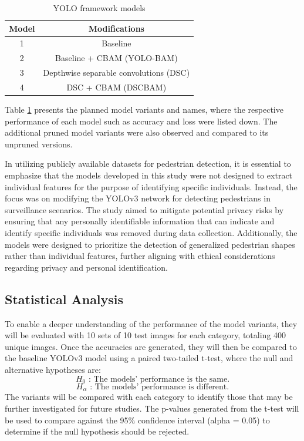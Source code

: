 \begin{table}[!htbp]
    \centering
    \caption{YOLO framework models}
    {
    \begin{tabular}{cc}
        Model & Modifications \\ \hline 
        1& Baseline\\ 
        \hline 
        2&Baseline + CBAM (YOLO-BAM)\\ 
        \hline 
        3& Depthwise separable convolutions (DSC)\\
        \hline
        4& DSC + CBAM (DSCBAM)\\
        \hline
    \end{tabular}
    }
    \label{tab:modelvars}
\end{table}

 Table \ref{tab:modelvars} presents the planned model variants and names, where the respective performance of each model such as accuracy and loss were listed down. The additional pruned model variants were also observed and compared to its unpruned versions.
 
In utilizing publicly available datasets for pedestrian detection, it is essential to emphasize that the models developed in this study were not designed to extract individual features for the purpose of identifying specific individuals. Instead, the focus was on modifying the YOLOv3 network for detecting pedestrians in surveillance scenarios. The study aimed to mitigate potential privacy risks by ensuring that any personally identifiable information that can indicate and identify specific individuals was removed during data collection. Additionally, the models were designed to prioritize the detection of generalized pedestrian shapes rather than individual features, further aligning with ethical considerations regarding privacy and personal identification.

\subsection{Statistical Analysis}
To enable a deeper understanding of the performance of the model variants, they will be evaluated with 10 sets of 10 test images for each category, totaling 400 unique images. Once the accuracies are generated, they will then be compared to the baseline YOLOv3 model using a paired two-tailed t-test, where the null and alternative hypotheses are:
\[H_{0} \text{ :  The models' performance is the same.}\] 
\[H_{\alpha} \text{ :  The models' performance is different.}\] 
The variants will be compared with each category to identify those that may be further investigated for future studies. The p-values generated from the t-test will be used to compare against the 95\% confidence interval (alpha = 0.05) to determine if the null hypothesis should be rejected.